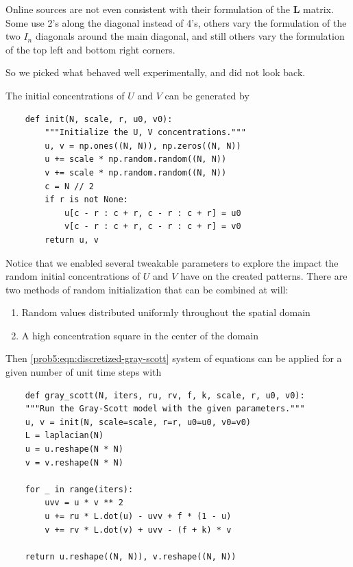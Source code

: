 Online sources are not even consistent with their formulation of the $\mathbf L$ matrix.
Some use 2's along the diagonal instead of 4's, others vary the formulation of the two $I_n$ diagonals around the main diagonal, and still others vary the formulation of the top left and bottom right corners.

So we picked what behaved well experimentally, and did not look back.

The initial concentrations of $U$ and $V$ can be generated by
\begin{verbatim}
    def init(N, scale, r, u0, v0):
        """Initialize the U, V concentrations."""
        u, v = np.ones((N, N)), np.zeros((N, N))
        u += scale * np.random.random((N, N))
        v += scale * np.random.random((N, N))
        c = N // 2
        if r is not None:
            u[c - r : c + r, c - r : c + r] = u0
            v[c - r : c + r, c - r : c + r] = v0
        return u, v
\end{verbatim}
Notice that we enabled several tweakable parameters to explore the impact the random initial concentrations of $U$ and $V$ have on the created patterns.
There are two methods of random initialization that can be combined at will:
\begin{enumerate}
    \item Random values distributed uniformly throughout the spatial domain
    \item A high concentration square in the center of the domain
\end{enumerate}

Then \autoref{prob5:eqn:discretized-gray-scott} system of equations can be applied for a given number of unit time steps with
\begin{verbatim}
    def gray_scott(N, iters, ru, rv, f, k, scale, r, u0, v0):
    """Run the Gray-Scott model with the given parameters."""
    u, v = init(N, scale=scale, r=r, u0=u0, v0=v0)
    L = laplacian(N)
    u = u.reshape(N * N)
    v = v.reshape(N * N)

    for _ in range(iters):
        uvv = u * v ** 2
        u += ru * L.dot(u) - uvv + f * (1 - u)
        v += rv * L.dot(v) + uvv - (f + k) * v

    return u.reshape((N, N)), v.reshape((N, N))
\end{verbatim}

